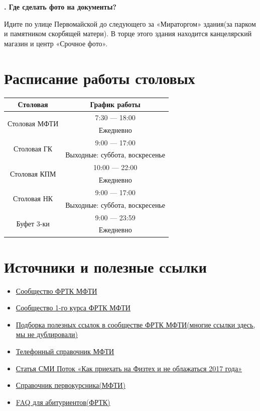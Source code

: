 \documentclass[14pt]{extarticle}
\newcounter{question}
\newcommand\Que[1]{%
    \begin{minipage}{\textwidth}
    \leavevmode\par
    \stepcounter{question}
    \noindent
    {\large\textbf{\thequestion. #1}}\par}
\newcommand\Ans[2][]{%
    \leavevmode\par\noindent
    {\leftskip37pt
    \textbf{#1}#2\par}
    \end{minipage}}
\begin{document}
\Que{Где сделать фото на документы?}
\Ans{Идите по улице Первомайской до следующего за «Мираторгом» здания(за парком и памятником скорбящей матери). В торце этого здания находится канцелярский магазин и центр «Срочное фото».}
\clearpage
\section{Расписание работы столовых}
\begin{center}
\begin{tabular}{ |c|c| }
\hline
\textbf{Столовая} & \textbf{График работы} \\ \hline

\multirow{2}{*}{Столовая МФТИ}
& 7:30 — 18:00 \\
& Ежедневно \\ \hline

\multirow{2}{*}{Столовая ГК}
& 9:00 — 17:00 \\
& Выходные: суббота, воскресенье \\ \hline

\multirow{2}{*}{Столовая КПМ}
& 10:00 — 22:00 \\
& Ежедневно \\ \hline

\multirow{2}{*}{Столовая НК}
& 9:00 — 17:00 \\
& Выходные: суббота, воскресенье \\ \hline

\multirow{2}{*}{Буфет 3-ки}
& 9:00 — 23:59 \\
& Ежедневно \\
\hline
\end{tabular}
\end{center}
\clearpage
\section{Источники и полезные ссылки}
\begin{itemize}
    \item \href{https://vk.com/drec_mipt}{Сообщество ФРТК МФТИ}
    \item \href{https://vk.com/drec_81x}{Сообщество 1-го курса ФРТК МФТИ}
    \item \href{https://vk.com/page-17708_53431599}{Подборка полезных ссылок в сообществе ФРТК МФТИ(многие ссылки здесь, мы не дублировали)}
    \item \href{https://mipt.ru/about/general/contacts/phones.php}{Телефонный справочник МФТИ}
    \item \href{http://miptstream.ru/2017/08/22/how_not_to_screw_up_3/}{Статья СМИ Поток «Как приехать на Физтех и не облажаться 2017 года»}
    \item \href{https://mipt.ru/students/1kurs.php}{Справочник первокурсника(МФТИ)}
    \item \href{https://mipt.ru/drec/abitur/faq.php}{FAQ для абитуриентов(ФРТК)}
\end{itemize}
\end{document}
